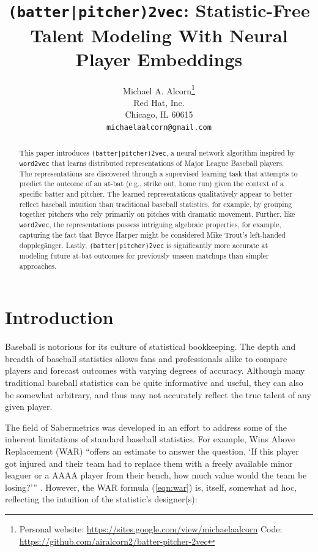 \documentclass{article}
\title{\texttt{(batter|pitcher)2vec}: Statistic-Free Talent Modeling With Neural Player Embeddings}
\date{}
\author{
    Michael A. Alcorn\thanks
    {Personal website: \url{https://sites.google.com/view/michaelaalcorn}\newline
    \hspace*{1.8em}Code: \url{https://github.com/airalcorn2/batter-pitcher-2vec}} \\
    Red Hat, Inc.\\
    Chicago, IL 60615 \\
    \texttt{michaelaalcorn@gmail.com} \\
}
\begin{document}
\maketitle

\begin{abstract}

This paper introduces \texttt{(batter|pitcher)2vec}, a neural network algorithm inspired by \texttt{word2vec} that learns distributed representations of Major League Baseball players. The representations are discovered through a supervised learning task that attempts to predict the outcome of an at-bat (e.g., strike out, home run) given the context of a specific batter and pitcher. The learned representations qualitatively appear to better reflect baseball intuition than traditional baseball statistics, for example, by grouping together pitchers who rely primarily on pitches with dramatic movement. Further, like \texttt{word2vec}, the representations possess intriguing algebraic properties, for example, capturing the fact that Bryce Harper might be considered Mike Trout's left-handed dopplegänger. Lastly, \texttt{(batter|pitcher)2vec} is significantly more accurate at modeling future at-bat outcomes for previously unseen matchups than simpler approaches.

\end{abstract}

\section{Introduction}

Baseball is notorious for its culture of statistical bookkeeping. The depth and breadth of baseball statistics allows fans and professionals alike to compare players and forecast outcomes with varying degrees of accuracy. Although many traditional baseball statistics can be quite informative and useful, they can also be somewhat arbitrary, and thus may not accurately reflect the true talent of any given player.

The field of Sabermetrics was developed in an effort to address some of the inherent limitations of standard baseball statistics. For example, Wins Above Replacement (WAR) ``offers an estimate to answer the question, `If this player got injured and their team had to replace them with a freely available minor leaguer or a AAAA player from their bench, how much value would the team be losing?'\thinspace'' \parencite{WAR}. However, the WAR formula (\ref{eqn:war}) is, itself, somewhat ad hoc, reflecting the intuition of the statistic's designer(s):
\end{document}
